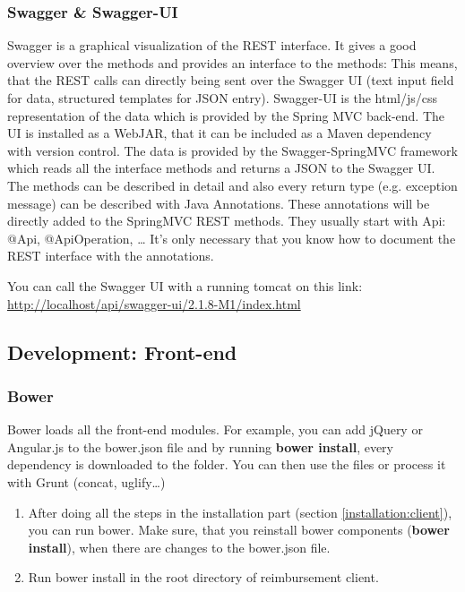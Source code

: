 \subsubsection{Swagger \& Swagger-UI}
Swagger is a graphical visualization of the REST interface. It gives a good overview over the methods and provides an interface to the methods: This means, that the REST calls can directly being sent over the Swagger UI (text input field for data, structured templates for JSON entry). Swagger-UI is the html/js/css representation of the data which is provided by the Spring MVC back-end. The UI is installed as a WebJAR, that it can be included as a Maven dependency with version control. The data is provided by the Swagger-SpringMVC framework which reads all the interface methods and returns a JSON to the Swagger UI. The methods can be described in detail and also every return type (e.g. exception message) can be described with Java Annotations. These annotations will be directly added to the SpringMVC REST methods. They usually start with Api: @Api, @ApiOperation, … It’s only necessary that you know how to document the REST interface with the annotations.\par
You can call the Swagger UI with a running tomcat on this link:
\url{http://localhost/api/swagger-ui/2.1.8-M1/index.html}

\subsection{Development: Front-end}

\subsubsection{Bower}
\label{dev:bower}
Bower loads all the front-end modules. For example, you can add jQuery or Angular.js to the bower.json file and by running \textbf{bower install}, every dependency is downloaded to the folder. You can then use the files or process it with Grunt (concat, uglify…)
\begin{enumerate}
	\item After doing all the steps in the installation part (section \ref{installation:client}), you can run bower. Make sure, that you reinstall bower components (\textbf{bower install}), when there are changes to the bower.json file.
	\item Run bower install in the root directory of reimbursement client.
\end{enumerate}

